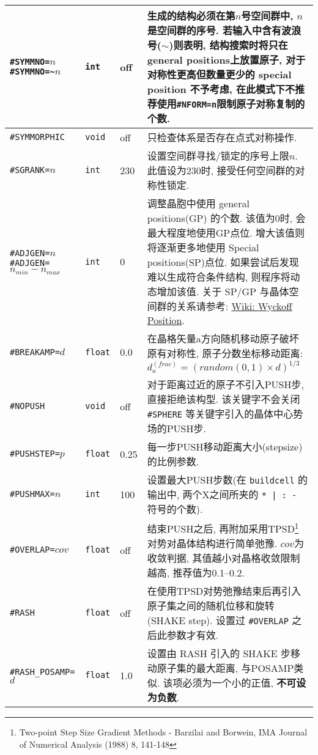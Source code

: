 \documentclass[a4paper, 10pt]{article}
\begin{document}
\begin{center}
\begin{longtable}{m{11em}|m{4em}<{\centering}|m{3em}<{\centering}|m{15em}}
\midrule
\verb|#SYMMNO=|\(n\)\hspace{6em} \verb|#SYMMNO=~|\(n\) & \verb|int| & off & 生成的结构必须在第\(n\)号空间群中, \(n\)是空间群的序号. 若输入中含有波浪号(\(\sim\))则表明, 结构搜索时将只在general positions上放置原子, 对于对称性更高但数量更少的 special position 不予考虑, 在此模式下不推荐使用\verb|#NFORM=n|限制原子对称复制的个数.\\
\midrule
\verb|#SYMMORPHIC| & \verb|void| & off & 只检查体系是否存在点式对称操作.\\
\midrule
\verb|#SGRANK=|\(n\) & \verb|int| & 230 & 设置空间群寻找/锁定的序号上限\(n\). 此值设为230时, 接受任何空间群的对称性锁定.\\
\midrule
\verb|#ADJGEN=|\(n\)\hspace{4em}\verb|#ADJGEN=|\(n_{min}-n_{max}\)  & \verb|int|  & 0 & 调整晶胞中使用 general positions(GP) 的个数. 该值为0时, 会最大程度地使用GP点位. 增大该值则将逐渐更多地使用 Special positions(SP)点位. 如果尝试后发现难以生成符合条件结构, 则程序将动态增加该值. 关于 SP/GP 与晶体空间群的关系请参考: \href{https://en.wikipedia.org/wiki/Wyckoff_positions}{Wiki: Wyckoff Position}.\\
\midrule
\verb|#BREAKAMP=|\(d\) & \verb|float| & 0.0 & 在晶格矢量a方向随机移动原子破坏原有对称性, 原子分数坐标移动距离: \(d^{(frac)}_a=(random(0,1)\times{}d)^{1/3}\)\\
\midrule
\verb|#NOPUSH|& \verb|void| & off & 对于距离过近的原子不引入PUSH步, 直接拒绝该构型. 该关键字不会关闭 \verb|#SPHERE| 等关键字引入的晶体中心势场的PUSH步.\\
\midrule
\verb|#PUSHSTEP=|\(p\)& \verb|float| & 0.25 & 每一步PUSH移动距离大小(stepsize)的比例参数.\\
\midrule
\verb|#PUSHMAX=|\(n\)& \verb|int| & 100 &设置最大PUSH步数(在 \verb|buildcell| 的输出中, 两个X之间所夹的 \verb!* | : -! 符号的个数).\\
\midrule
\verb|#OVERLAP=|\(cov\)& \verb|float| & off & 结束PUSH之后, 再附加采用TPSD\footnote{Two-point Step Size Gradient Methods - Barzilai and Borwein, IMA Journal of Numerical Analysis (1988) 8, 141-148}对势对晶体结构进行简单弛豫. \(cov\)为收敛判据, 其值越小对晶格收敛限制越高, 推荐值为0.1--0.2.\\
\midrule
\verb|#RASH|& \verb|float| & off & 在使用TPSD对势弛豫结束后再引入原子集之间的随机位移和旋转(SHAKE step). 设置过 \verb|#OVERLAP| 之后此参数才有效.\\
\midrule
\verb|#RASH_POSAMP=|\(d\)& \verb|float| & 1.0 & 设置由 RASH 引入的 SHAKE 步移动原子集的最大距离, 与POSAMP类似. 该项必须为一个小的正值, \textbf{不可设为负数}.\\

\end{longtable}
\end{center}
\end{document}

